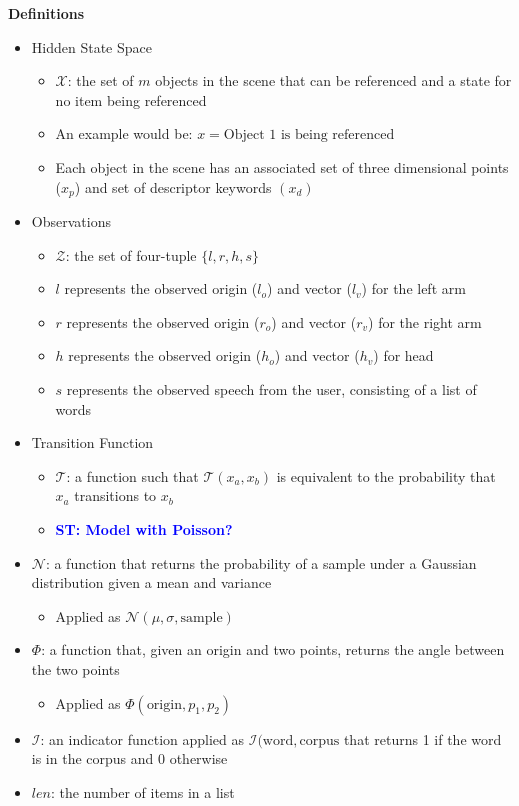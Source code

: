 \documentclass[letterpaper, 10 pt, conference]{ieeeconf}
\newcommand{\stnote}[1]{\textcolor{Blue}{\textbf{ST: #1}}}
\begin{document}
\textbf{Definitions}
\begin{itemize}
\item{Hidden State Space}
	\begin{itemize}
	\item{$\mathcal{X}$: the set of $m$ objects in the scene that can be referenced and a state for no item being referenced}
	\item{An example would be: $x = \text{Object 1 is being referenced}$}
	\item{Each object in the scene has an associated set of three dimensional points ($x_p$) and set of descriptor keywords $(x_d)$}
	\end{itemize}
\item{Observations}
	\begin{itemize}
	\item{$\mathcal{Z}$: the set of four-tuple $\{l, r, h, s\}$}
	\item{$l$ represents the observed origin ($l_o$) and vector ($l_v$) for the left arm}
	\item{$r$ represents the observed origin  ($r_o$) and vector ($r_v$)  for the right arm}
	\item{$h$ represents the observed origin  ($h_o$) and vector ($h_v$)  for head}
	\item{$s$ represents the observed speech from the user, consisting of a list of words}
	\end{itemize}
\item{Transition Function}
	\begin{itemize}
	\item{$\mathcal{T}$: a function such that $\mathcal{T}(x_a, x_b)$ is equivalent to the probability that $x_a$ transitions to $x_b$}
	\item{\stnote{Model with Poisson?}}
	\end{itemize}
\item{$\mathcal{N}$: a function that returns the probability of a sample under a Gaussian distribution given a mean and variance}
	\begin{itemize}
	\item{Applied as $\mathcal{N}(\mu, \sigma, \text{sample})$}
	\end{itemize}
\item{$\Phi$: a function that, given an origin and two points, returns the angle between the two points}
	\begin{itemize}
	\item{Applied as $\Phi(\text{origin}, p_1, p_2)$}
	\end{itemize}
\item{$\mathcal{I}$: an indicator function applied as $\mathcal{I}(\text{word}, \text{corpus}$ that returns 1 if the word is in the corpus and 0 otherwise}
\item{$len$: the number of items in a list}
\end{itemize}
\end{document}
